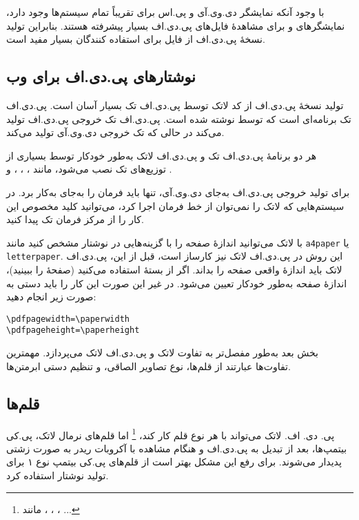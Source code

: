 با وجود آنکه نمایشگر دی.وی.آی و پی.اس برای تقریباً تمام سیستم‌ها وجود دارد، نمایشگر\-های 
 و   برای مشاهدهٔ فایل‌های پی.دی.اف بسیار پیشرفته هستند. بنابر\-این تولید نسخهٔ پی.دی.اف از فایل برای استفاده کنندگان بسیار مفید است.
\subsection{نوشتارهای پی.دی.اف برای وب}

تولید نسخهٔ پی.دی.اف از کد لاتک توسط پی.دی.اف تک بسیار آسان است. پی.دی.اف تک برنامه‌ای است که توسط  نوشته شده است. پی.دی.اف تک خروجی پی.دی.اف تولید می‌کند در حالی که تک خروجی دی.وی.آی تولید می‌کند. 

هر دو برنامهٔ پی.دی.اف تک و پی.دی.اف لاتک به‌طور خودکار توسط بسیاری از توزیع‌های تک نصب می‌شود، مانند  ، ، 
،  و .

برای تولید خروجی پی.دی.اف به‌جای دی.وی.آی، تنها باید فرمان   را به‌جای  به‌کار برد. 
در سیستم‌هایی که لاتک را نمی‌توان از خط فرمان اجرا کرد، می‌توانید کلید مخصوص این کار را از مرکز فرمان تک پیدا کنید.

با لاتک می‌توانید اندازهٔ صفحه را با گزینه‌هایی در نوشتار‌ مشخص کنید مانند  \texttt{a4paper} یا \texttt{letterpaper}. 
این روش در پی.دی.اف لاتک نیز کارساز است، قبل از این، پی.دی.اف لاتک باید اندازهٔ واقعی صفحه را بداند.
اگر از بستهٔ  استفاده می‌کنید (صفحهٔ 
\pageref{ssec:pdfhyperref} را ببینید)، اندازهٔ صفحه به‌طور خودکار تعیین می‌شود. در غیر این صورت این کار را باید دستی به صورت زیر انجام دهید:
\begin{code}
\begin{verbatim}
\pdfpagewidth=\paperwidth
\pdfpageheight=\paperheight
\end{verbatim}
\end{code}

بخش بعد به‌طور مفصل‌تر به تفاوت لاتک و پی.دی.اف لاتک می‌پردازد. مهمترین تفاوت‌ها عبارتند از قلم‌ها، نوع تصاویر الصاقی، و تنظیم دستی ابرمتن‌ها.

\subsection{قلم‌ها}

{پی. دی. اف. لاتک }
می‌تواند با هر نوع قلم کار کند،%
\footnote{مانند ، ، ، ...} 
اما قلم‌های نرمال لاتک، پی.کی بیتمپ‌ها، بعد از  تبدیل به پی.دی.اف و هنگام مشاهده با آکروبات ریدر به صورت زشتی پدیدار می‌شوند. برای رفع این مشکل بهتر است از قلم‌های پی.کی بیتمپ نوع ۱ برای تولید نوشتار‌‌ استفاده کرد.  


